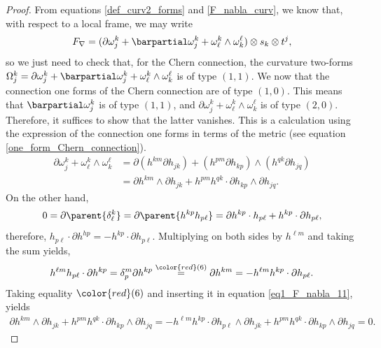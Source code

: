 \begin{proof}
    From equations \eqref{def_curv2_forms} and \eqref{F_nabla_curv}, we know that, with respect to a local frame, we may write
    \[
    F_\nabla = (\partial \omega^k_j + \barpartial \omega^k_j + \omega^k_\ell \wedge \omega^\ell_k) \otimes s_k \otimes t^j,
    \]
    so we just need to check that, for the Chern connection, the curvature two-forms \(\Omega_j^k=\partial \omega^k_j + \barpartial \omega^k_j + \omega^k_\ell \wedge \omega^\ell_k\) is of type \((1,1)\). We now that the connection one forms of the Chern connection are of type \((1,0)\). This means that \(\barpartial \omega^k_j \) is of type \((1,1)\), and \(\partial \omega^k_j + \omega^k_\ell \wedge \omega^\ell_k\) is of type \((2,0)\). Therefore, it suffices to show that the latter vanishes. This is a calculation using the expression of the connection one forms in terms of the metric (see equation \eqref{one_form_Chern_connection}). 
    \begin{equation} \label{eq1_F_nabla_11}
        \begin{split}
        \partial \omega^k_j + \omega^k_\ell \wedge \omega^\ell_k & = \partial (h^{km} \partial h_{jk})+ (h^{pm} \partial h_{kp}) \wedge (h^{qk} \partial h_{jq})  \\
        & = \partial h^{km} \wedge \partial h_{jk} + h^{pm}h^{qk} \cdot \partial h_{kp} \wedge \partial h_{jq}.
    \end{split}
    \end{equation}
    On the other hand, 
    \[
    0=\partial\parent{\delta ^k_\ell} = \partial \parent{h^{kp}h_{p\ell}}=\partial h^{kp} \cdot h_{p \ell} + h^{kp} \cdot \partial h_{p \ell},
    \]
    therefore, \(h_{p \ell} \cdot \partial h^{hp}=-h^{kp} \cdot \partial h_{p \ell}\). Multiplying on both sides by \(h^{\ell m}\) and taking the sum yields, 
    \[
    h^{\ell m} h_{p \ell} \cdot \partial h^{kp}=\delta^m_p \partial h^{kp}\overset{{\color{red}(6)}}{=}\partial h^{km}=-h^{\ell m} h^{kp} \cdot \partial h_{p\ell}.
    \]
    Taking equality \({\color{red}(6)}\) and inserting it in equation \eqref{eq1_F_nabla_11}, yields
    \begin{align*}
        \partial h^{km} \wedge \partial h_{jk} + h^{pm}h^{qk} \cdot \partial h_{kp} \wedge \partial h_{jq}= -h^{\ell m}h^{kp} \cdot \partial h_{p \ell} \wedge \partial h_{jk}+ h^{pm}h^{qk} \cdot \partial h_{kp} \wedge \partial h_{jq}=0.
    \end{align*}
\end{proof}

